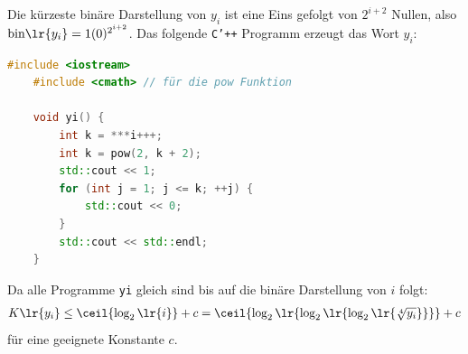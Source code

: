 \begin{questions}
\begin{solution}
		\vspace{\baselineskip}
		Die kürzeste binäre Darstellung von $y_i$ ist eine Eins gefolgt von $2^{i+2}$ Nullen, also $\text{bin}\lr{y_i} = 1(0)^{2^{i+2}}$. Das folgende \texttt{C'++} Programm erzeugt das Wort $y_i$:
		\begin{lstlisting}[language=C++,caption=$yi$]
    #include <iostream>
    #include <cmath> // für die pow Funktion
    
    void yi() {
        int k = ***i+++;
        int k = pow(2, k + 2);
		std::cout << 1;
        for (int j = 1; j <= k; ++j) {
            std::cout << 0;
        }
        std::cout << std::endl;
    }
\end{lstlisting}
	Da alle Programme \texttt{yi} gleich sind bis auf die binäre Darstellung von $i$ folgt:
	\begin{align*}
		K\lr{y_i} \leq \ceil{\log_2\lr{i}} + c = \ceil{\log_2\lr{\log_2\lr{\log_2\lr{\sqrt[4]{y_i}}}}} + c
	\end{align*}
	für eine geeignete Konstante $c$.
	\end{solution}
\end{questions}
